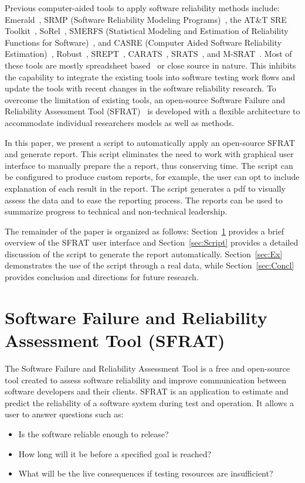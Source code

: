 \documentclass[journal]{IEEEtran}
\begin{document}
Previous computer-aided tools to apply software reliability methods include: Emerald~\cite{1996hudepohlemerald}, SRMP (Software Reliability Modeling Programs)~\cite{1988SRMP}, the AT\&T SRE Toolkit~\cite{1990ATT}, SoRel~\cite{1993kanounsorel}, SMERFS (Statistical Modeling and Estimation of Reliability Functions for Software)~\cite{trSMERFS}, and CASRE (Computer Aided Software Reliability Estimation)~\cite{lyu1992casre}, Robust~\cite{1995lirobust}, SREPT~\cite{2000ramanisrept}, CARATS~\cite{2011huangestimation}, SRATS~\cite{inProcISSRE2013_100}, and M-SRAT~\cite{2015shibatam}. Most of these tools are mostly spreadsheet based~\cite{inProcISSRE2013_100} or close source in nature. This inhibits the capability to integrate the existing tools into software testing work flows and update the tools with recent changes in the software reliability research. To overcome the limitation of existing tools, an open-source Software Failure and Reliability Assessment Tool (SFRAT)~\cite{cFio53} is developed with a flexible architecture to accommodate individual researchers models as well as methods.

In this paper, we present a script to automatically apply an open-source SFRAT and generate report. This script eliminates the need to work with graphical user interface to manually prepare the a report, thus conserving time. The script can be configured to produce custom reports, for example, the user can opt to include explanation of each result in the report. The script generates a pdf to visually assess the data and to ease the reporting process. The reports can be used to summarize progress to technical and non-technical leadership.

The remainder of the paper is organized as follows: Section~\ref{sec:SFRAT} provides a brief overview of the SFRAT user interface and Section~\ref{sec:Script} provides a detailed discussion of the script to generate the report automatically. Section~\ref{sec:Ex} demonstrates the use of the script through a real data, while Section~\ref{sec:Concl} provides conclusion and directions for future research.


\section{Software Failure and Reliability Assessment Tool (SFRAT)}\label{sec:SFRAT}
The Software Failure and Reliability Assessment Tool is a free and open-source tool created to assess software reliability and improve communication between software developers and their clients. SFRAT is an application to estimate and predict the reliability of a software system during test and operation. It allows a user to answer questions such as:
\begin{itemize}
\item {Is the software reliable enough to release?}
\item {How long will it be before a specified goal is reached?}
\item {What will be the live consequences if testing resources are insufficient?}
\end{itemize}
\end{document}

